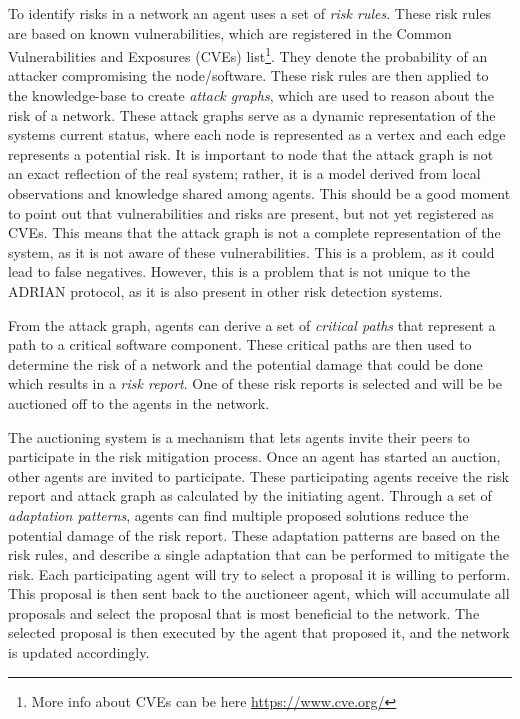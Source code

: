 To identify risks in a network an agent uses a set of \emph{risk rules}. These risk rules are based on known vulnerabilities, which are registered in the Common Vulnerabilities and Exposures (CVEs) list\footnote{More info about CVEs can be here \url{https://www.cve.org/} }. They denote the probability of an attacker compromising the node/software. These risk rules are then applied to the knowledge-base to create \emph{attack graphs}, which are used to reason about the risk of a network. These attack graphs serve as a dynamic representation of the systems current status, where each node is represented as a vertex and each edge represents a potential risk. It is important to node that the attack graph is not an exact reflection of the real system; rather, it is a model derived from local observations and knowledge shared among agents. 
This should be a good moment to point out that vulnerabilities and risks are present, but not yet registered as CVEs. This means that the attack graph is not a complete representation of the system, as it is not aware of these vulnerabilities. This is a problem, as it could lead to false negatives. However, this is a problem that is not unique to the ADRIAN protocol, as it is also present in other risk detection systems.


From the attack graph, agents can derive a set of \emph{critical paths} that represent a path to a critical software component. These critical paths are then used to determine the risk of a network and the potential damage that could be done which results in a \emph{risk report}. One of these risk reports is selected and will be be auctioned off to the agents in the network.

The auctioning system is a mechanism that lets agents invite their peers to participate in the risk mitigation process. Once an agent has started an auction, other agents are invited to participate. These participating agents receive the risk report and attack graph as calculated by the initiating agent. Through a set of \emph{adaptation patterns}, agents can find multiple proposed solutions reduce the potential damage of the risk report. These adaptation patterns are based on the risk rules, and describe a single adaptation that can be performed to mitigate the risk.
Each participating agent will try to select a proposal it is willing to perform. This proposal is then sent back to the auctioneer agent, which will accumulate all proposals and select the proposal that is most beneficial to the network. The selected proposal is then executed by the agent that proposed it, and the network is updated accordingly.
